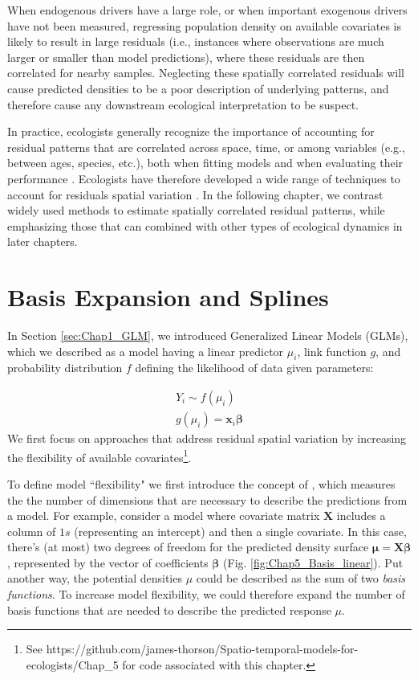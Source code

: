 When endogenous drivers have a large role, or when important exogenous drivers have not been measured, regressing population density on available covariates is likely to result in large residuals (i.e., instances where observations are much larger or smaller than model predictions), where these residuals are then correlated for nearby samples.  Neglecting these spatially correlated residuals will cause predicted densities to be a poor description of underlying patterns, and therefore cause any downstream ecological interpretation to be suspect.  

In practice, ecologists generally recognize the importance of accounting for residual patterns that are correlated across space, time, or among variables (e.g., between ages, species, etc.), both when fitting models \cite{dormann_correlation_2012} and when evaluating their performance \cite{roberts_cross-validation_2017}.  Ecologists have therefore developed a wide range of techniques to account for residuals spatial variation \cite{dormann_collinearity_2013}.  In the following chapter, we contrast widely used methods to estimate spatially correlated residual patterns, while emphasizing those that can combined with other types of ecological dynamics in later chapters.    

\section{Basis Expansion and Splines} \label{sec:Chap5:splines}

In Section \ref{sec:Chap1_GLM}, we introduced Generalized Linear Models (GLMs), which we described as a model having a linear predictor \( \mu_i \), link function \(g\), and probability distribution \(f\) defining the likelihood of data given parameters:

\begin{gather}
    Y_i \sim f(\mu_i) \\
    g(\mu_i) = \mathbf{x}_i \mathbf{\beta}
\end{gather}
We first focus on approaches that address residual spatial variation by increasing the flexibility of available covariates\footnote{See https://github.com/james-thorson/Spatio-temporal-models-for-ecologists/Chap\_5 for code associated with this chapter.}.  

To define model ``flexibility" we first introduce the concept of , which measures the the number of dimensions that are necessary to describe the predictions from a model.  For example, consider a model where covariate matrix \( \mathbf X \) includes a column of \(1s\) (representing an intercept) and then a single covariate.  In this case, there's (at most) two degrees of freedom for the predicted density surface \( \mathbf{\mu = X \beta} \), represented by the vector of coefficients \( \mathbf{\beta} \) (Fig. \ref{fig:Chap5_Basis_linear}).  Put another way, the potential  densities \( \mu \) could be described as the sum of two \textit{basis functions}.  To increase model flexibility, we could therefore expand the number of basis functions that are needed to describe the predicted response \( \mu \).  

